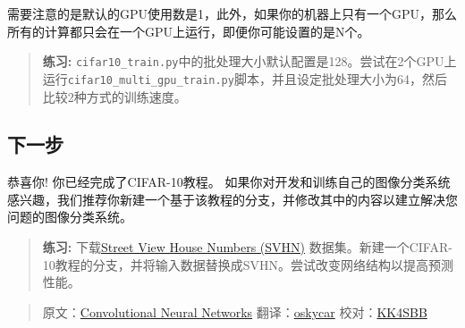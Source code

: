 需要注意的是默认的GPU使用数是1，此外，如果你的机器上只有一个GPU，那么所有的计算都只会在一个GPU上运行，即便你可能设置的是N个。

\begin{quote}
\textbf{练习:}
\texttt{cifar10\_train.py}中的批处理大小默认配置是128。尝试在2个GPU上运行\texttt{cifar10\_multi\_gpu\_train.py}脚本，并且设定批处理大小为64，然后比较2种方式的训练速度。
\end{quote}

\subsection{下一步 }\label{ux4e0bux4e00ux6b65}

恭喜你! 你已经完成了CIFAR-10教程。 如果你对开发和训练自己的图像分类系统感兴趣，我们推荐你新建一个基于该教程的分支，并修改其中的内容以建立解决您问题的图像分类系统。

\begin{quote}
\textbf{练习:} 下载\href{http://ufldl.stanford.edu/housenumbers/}{Street
View House Numbers (SVHN)}
数据集。新建一个CIFAR-10教程的分支，并将输入数据替换成SVHN。尝试改变网络结构以提高预测性能。
\end{quote}

\begin{quote}
原文：\href{http://tensorflow.org/tutorials/deep_cnn/index.md}{Convolutional
Neural Networks} 翻译：\href{https://github.com/oskycar}{oskycar}
校对：\href{https://github.com/zhyhooo}{KK4SBB}
\end{quote}
